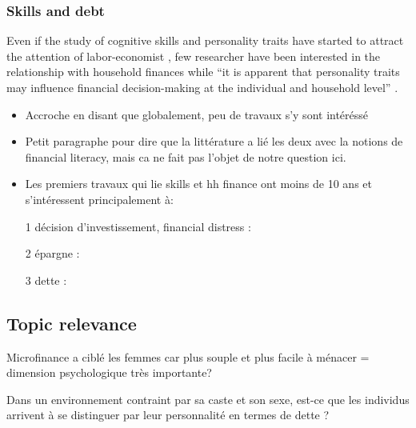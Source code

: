 \documentclass[a4paper, 11pt, onecolumn]{article}
\begin{document}
		\subsubsection{Skills and debt}

Even if the study of cognitive skills and personality traits have started to attract the attention of labor-economist \citep{Almlund2011}, few researcher have been interested in the relationship with household finances while ``it is apparent that personality traits may influence financial decision-making at the individual and household level'' \citep{Brown2014}.



\begin{itemize}
\item Accroche en disant que globalement, peu de travaux s'y sont intéréssé
\item Petit paragraphe pour dire que la littérature a lié les deux avec la notions de financial literacy, mais ca ne fait pas l'objet de notre question ici. \citep{Hastings2013} \citep{Varum2014} \citep{Pinjisakikool2017} \citep{Gaurav2012} \citep{Hastings2013} 
\item Les premiers travaux qui lie skills et hh finance ont moins de 10 ans et s'intéressent principalement à:
\item[1] décision d'investissement, financial distress : \citep{Nga2013} \citep{Pinjisakikool2017b} \citep{Bucciol2017} \citep{Agarwal2013} \citep{Parise2019}
\item[2] épargne  : \citep{CobbClark2016} \citep{Gerhard2018}
\item[3] dette : \citep{Forlicz2019} \citep{Silva2018} \citep{Brown2014}
\end{itemize}









	\subsection{Topic relevance}
Microfinance a ciblé les femmes car plus souple et plus facile à ménacer = dimension psychologique très importante? 

Dans un environnement contraint par sa caste et son sexe, est-ce que les individus arrivent à se distinguer par leur personnalité en termes de dette ?
\end{document}
